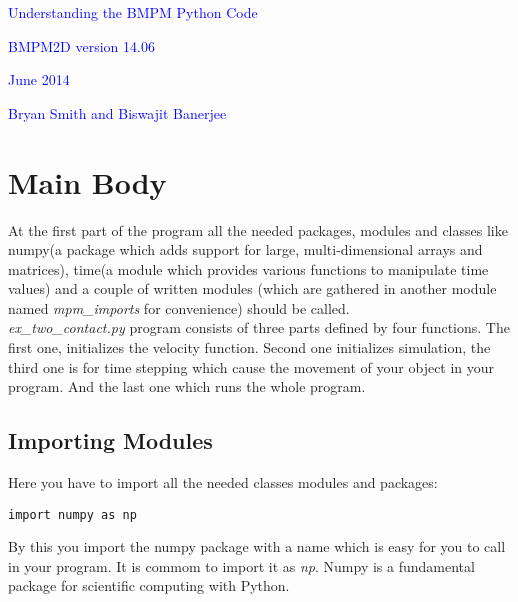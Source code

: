 \documentclass[11pt,fleqn]{book} %
\begin{document}
  \begingroup
    \thispagestyle{empty}
    \AddToShipoutPicture*{\BackgroundPic} %
    \centering
    \vspace*{1cm}
    \par\normalfont\fontsize{35}{35}\sffamily\selectfont
    \textcolor{blue}{Understanding the BMPM Python Code}\par %
    \vspace*{1cm}
    {\Huge \textcolor{blue}{BMPM2D version 14.06}}\par
    {\Huge \textcolor{blue}{June 2014}}\par
    \vspace*{1cm}
    {\Huge \textcolor{blue}{Bryan Smith and Biswajit Banerjee}}\par %
  \endgroup

  


\chapter{Main Body} 
\label{sec:Main Body} 
At the first part of the program all the needed packages, modules and classes like numpy(a package which adds support for large, multi-dimensional arrays and matrices), time(a module which provides various functions to manipulate time values) and a couple of written modules (which are gathered in another module named  \emph{mpm\_imports} for convenience) should be called. \\ \emph{ex\_two\_contact.py} program consists of three parts defined by four functions. The first one, initializes the velocity function. Second one initializes simulation, the third one is for time stepping which cause the movement of your object in your program. And the last one which runs the whole program.

\section{Importing Modules}
Here you have to import all the needed classes modules and packages:

\begin{lstlisting}
import numpy as np
\end{lstlisting}

By this you import the numpy package with a name which is easy for you to call in your program. It is commom to import it as \emph{np}. Numpy is a fundamental package for scientific computing with Python.
\end{document}
